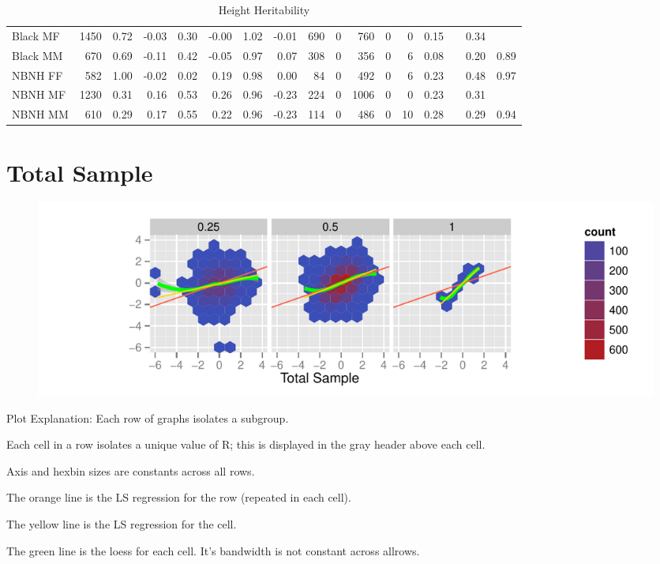 \documentclass[a4paper]{article}
\begin{document}
\begin{table}[ht]
\begin{center}
\begin{tabular}{lr|rrr|rrr|rrrrr|rrrr}
  Black MF & 1450 & 0.72 & -0.03 & 0.30 & -0.00 & 1.02 & -0.01 & 690 & 0 & 760 & 0 & 0 & 0.15 &  & 0.34 &  \\ 
  Black MM & 670 & 0.69 & -0.11 & 0.42 & -0.05 & 0.97 & 0.07 & 308 & 0 & 356 & 0 & 6 & 0.08 &  & 0.20 & 0.89 \\ 
   \hline
NBNH FF & 582 & 1.00 & -0.02 & 0.02 & 0.19 & 0.98 & 0.00 & 84 & 0 & 492 & 0 & 6 & 0.23 &  & 0.48 & 0.97 \\ 
  NBNH MF & 1230 & 0.31 & 0.16 & 0.53 & 0.26 & 0.96 & -0.23 & 224 & 0 & 1006 & 0 & 0 & 0.23 &  & 0.31 &  \\ 
  NBNH MM & 610 & 0.29 & 0.17 & 0.55 & 0.22 & 0.96 & -0.23 & 114 & 0 & 486 & 0 & 10 & 0.28 &  & 0.29 & 0.94 \\ 
  \end{tabular}
\caption{Height Heritability}
\label{tab:two}
\end{center}
\end{table}%
\section{Total Sample}
\begin{figure}[htbp]
\includegraphics{Height-004}
\end{figure}
Plot Explanation: Each row of graphs isolates a subgroup.  

Each cell in a row isolates a unique value of R; this is displayed in the gray header above each cell. 

Axis and hexbin sizes are constants across all rows.

The orange line is the LS regression for the row (repeated in each cell).

The yellow line is the LS regression for the cell.

The green line is the loess for each cell.  It's bandwidth is not constant across allrows.
\end{document}
